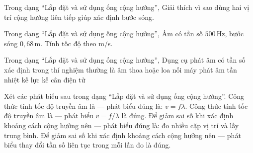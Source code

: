\begin{ex}
Trong dạng “Lắp đặt và sử dụng ống cộng hưởng”, Giải thích vì sao dùng hai vị trí cộng hưởng liên tiếp giúp xác định bước sóng.
\choiceTF

\end{ex}

\begin{ex}
Trong dạng “Lắp đặt và sử dụng ống cộng hưởng”, Âm có tần số $500\,\text{Hz}$, bước sóng $0,68\,\text{m}$. Tính tốc độ theo m/s.
\end{ex}

\begin{ex}
Trong dạng “Lắp đặt và sử dụng ống cộng hưởng”, Dụng cụ phát âm có tần số xác định trong thí nghiệm thường là
\choice
{\True âm thoa hoặc loa nối máy phát âm tần}
{nhiệt kế}
{lực kế}
{cân điện tử}
\end{ex}

\begin{ex}
Xét các phát biểu sau trong dạng “Lắp đặt và sử dụng ống cộng hưởng”.
\choiceTF
{\True Công thức tính tốc độ truyền âm là — phát biểu đúng là: $v=f\lambda$.}
{Công thức tính tốc độ truyền âm là — phát biểu $v=f/\lambda$ là đúng.}
{\True Để giảm sai số khi xác định khoảng cách cộng hưởng nên — phát biểu đúng là: đo nhiều cặp vị trí và lấy trung bình.}
{Để giảm sai số khi xác định khoảng cách cộng hưởng nên — phát biểu thay đổi tần số liên tục trong mỗi lần đo là đúng.}
\end{ex}

